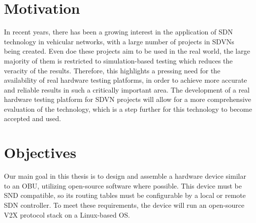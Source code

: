 
\section{Motivation} %
\label{sec:motivation}


In recent years, there has been a growing interest in the application of SDN technology in vehicular networks, with a large number of projects in SDVNs being created. Even doe these projects aim to be used in the real world, the large majority of them is restricted to simulation-based testing which reduces the veracity of the results. Therefore, this highlights a pressing need for the availability of real hardware testing platforms, in order to achieve more accurate and reliable results in such a critically important area. The development of a real hardware testing platform for SDVN projects will allow for a more comprehensive evaluation of the technology, which is a step further for this technology to become accepted and used.


\section{Objectives} %
\label{sec:objectives}

Our main goal in this thesis is to design and assemble a hardware device similar to an OBU, utilizing open-source software where possible. This device must be SND compatible, so its routing tables must be configurable by a local or remote SDN controller. To meet these requirements, the device will run an open-source V2X protocol stack on a Linux-based OS.


